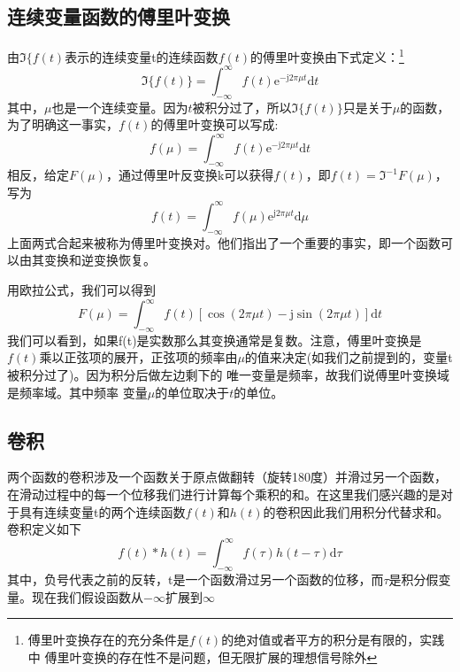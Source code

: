 \documentclass[UTF8,a4paper]{ctexart}
\begin{document}
\subsection{连续变量函数的傅里叶变换}
由$\Im\{f(t)$表示的连续变量t的连续函数$f(t)$的傅里叶变换由下式定义：\footnote{傅里叶变换存在的充分条件是$f(t)$的绝对值或者平方的积分是有限的，实践中 傅里叶变换的存在性不是问题，但无限扩展的理想信号除外}
\begin{equation}
	\Im\{f(t)\}=\int_{-\infty}^{\infty} f(t) \mathrm{e}^{-\mathrm{j} 2 \pi \mu t} \mathrm{d} t
\end{equation}
其中，$\mu$也是一个连续变量。因为$t$被积分过了，所以$\Im\{f(t)\}$只是关于$\mu$的函数，为了明确这一事实，$f(t)$的傅里叶变换可以写成:
\begin{equation}
	f(\mu)=\int_{-\infty}^{\infty} f(t) \mathrm{e}^{-\mathrm{j} 2 \pi \mu t} \mathrm{d} t
\end{equation}
相反，给定$F(\mu)$，通过傅里叶反变换k可以获得$f(t)$，即$f(t)=\Im^{-1}{F(\mu)}$，写为
\begin{equation}
	f(t)=\int_{-\infty}^{\infty} f(\mu) \mathrm{e}^{\mathrm{j} 2 \pi \mu t} \mathrm{d} \mu
\end{equation}
上面两式合起来被称为傅里叶变换对。他们指出了一个重要的事实，即一个函数可以由其变换和逆变换恢复。\par
用欧拉公式，我们可以得到
\begin{equation}
	F(\mu)=\int_{-\infty}^{\infty} f(t)[\cos (2 \pi \mu t)-\mathrm{j} \sin (2 \pi \mu t)] \mathrm{d} t
\end{equation}
我们可以看到，如果f(t)是实数那么其变换通常是复数。注意，傅里叶变换是$f(t)$乘以正弦项的展开，正弦项的频率由$\mu$的值来决定(如我们之前提到的，变量t被积分过了)。因为积分后做左边剩下的 唯一变量是频率，故我们说傅里叶变换域是频率域。其中频率  变量$\mu$的单位取决于$t$的单位。
\subsection{卷积}
两个函数的卷积涉及一个函数关于原点做翻转（旋转180度）并滑过另一个函数，在滑动过程中的每一个位移我们进行计算每个乘积的和。在这里我们感兴趣的是对于具有连续变量t的两个连续函数$f(t)$和$h(t)$的卷积因此我们用积分代替求和。卷积定义如下
\begin{equation}
	f(t) * h(t)=\int_{-\infty}^{\infty} f(\tau) h(t-\tau) \mathrm{d} \tau
\end{equation}
其中，负号代表之前的反转，t是一个函数滑过另一个函数的位移，而$\tau$是积分假变量。现在我们假设函数从$-\infty$扩展到$\infty$
\end{document}
